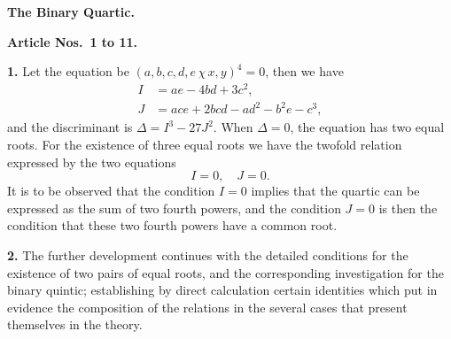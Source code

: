 \documentclass[11pt,a4paper]{article}
\theoremstyle{definition}
\begin{document}
\vspace{8pt}
\noindent\textbf{The Binary Quartic.}

\medskip
\noindent\textbf{Article Nos.~1 to 11.}

\medskip
\noindent\textbf{1.} Let the equation be $(a, b, c, d, e \,\chi\, x, y)^4 = 0$, then we have
\begin{align*}
I &= ae - 4bd + 3c^2,\\
J &= ace + 2bcd - ad^2 - b^2e - c^3,
\end{align*}
and the discriminant is $\Delta = I^3 - 27J^2$. When $\Delta = 0$, the equation has two equal roots. For the existence of three equal roots we have the twofold relation expressed by the two equations
\[
I = 0, \quad J = 0.
\]
It is to be observed that the condition $I = 0$ implies that the quartic can be expressed as the sum of two fourth powers, and the condition $J = 0$ is then the condition that these two fourth powers have a common root.

\medskip
\noindent\textbf{2.} The further development continues with the detailed conditions for the existence of two pairs of equal roots, and the corresponding investigation for the binary quintic; establishing by direct calculation certain identities which put in evidence the composition of the relations in the several cases that present themselves in the theory.
\end{document}
